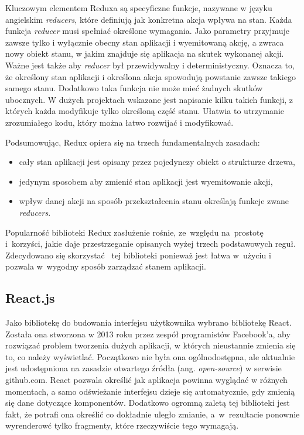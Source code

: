 \documentclass[11pt,a4paper,polish,thesis]{dcsbook}
\begin{document}
	Kluczowym elementem Reduxa są specyficzne funkcje, nazywane w języku angielskim \textit{reducers}, które definiują jak konkretna akcja wpływa na stan. Każda funkcja \textit{reducer} musi spełniać określone wymagania. Jako parametry przyjmuje zawsze tylko i wyłącznie obecny stan aplikacji i wyemitowaną akcję, a zwraca nowy obiekt stanu, w jakim znajduje się aplikacja na skutek wykonanej akcji. Ważne jest także aby \textit{reducer} był przewidywalny i deterministyczny. Oznacza to, że określony stan aplikacji i określona akcja spowodują powstanie zawsze takiego samego stanu. Dodatkowo taka funkcja nie może mieć żadnych skutków ubocznych. W dużych projektach wskazane jest napisanie kilku takich funkcji, z których każda modyfikuje tylko określoną część stanu. Ułatwia to utrzymanie zrozumiałego kodu, który można łatwo rozwijać i modyfikować.
	
	Podsumowując, Redux opiera się na trzech fundamentalnych zasadach:	
	\begin{itemize}
		\item cały stan aplikacji jest opisany przez pojedynczy obiekt o strukturze drzewa,
		\item jedynym sposobem aby zmienić stan aplikacji jest wyemitowanie akcji,
		\item wpływ danej akcji na sposób przekształcenia stanu określają funkcje zwane \textit{reducers}.
	\end{itemize}

	Popularność biblioteki Redux zasłużenie rośnie, ze~względu na~prostotę i~korzyści, jakie daje przestrzeganie opisanych wyżej trzech podstawowych reguł. Zdecydowano się skorzystać ~tej biblioteki ponieważ jest łatwa w~użyciu i pozwala w~wygodny sposób zarządzać stanem aplikacji. 
	
	\subsection{React.js}
	 
	 Jako bibliotekę do budowania interfejsu użytkownika wybrano bibliotekę React. 
	 Została ona stworzona w 2013 roku przez zespół programistów Facebook'a, aby rozwiązać problem tworzenia dużych aplikacji, w których nieustannie zmienia się to, co należy wyświetlać. Początkowo nie była ona ogólnodostępna, ale aktualnie jest udostępniona na zasadzie otwartego źródła (ang. \textit{open-source}) w serwisie github.com. React pozwala określić jak aplikacja powinna wyglądać w różnych momentach, a samo odświeżanie interfejsu dzieje się automatycznie, gdy zmienią się dane dotyczące komponentów. Dodatkowo ogromną zaletą tej biblioteki jest fakt, że potrafi ona określić co dokładnie uległo zmianie, a~w~rezultacie ponownie wyrenderowć tylko fragmenty, które rzeczywiście tego wymagają.
	 
\end{document}
